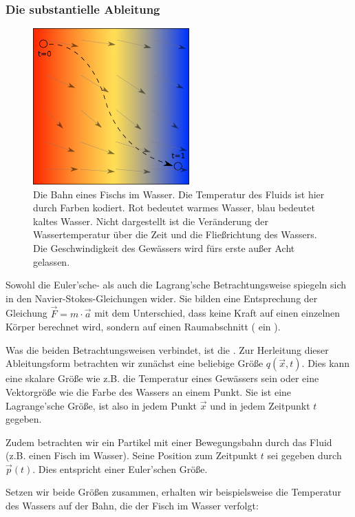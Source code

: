 \subsubsection{Die substantielle Ableitung}

\begin{figure}[ht]
\includegraphics[width=6cm]{images/swimmer_in_water}
\caption{Die Bahn eines Fischs im Wasser. Die Temperatur des Fluids ist hier durch Farben kodiert. Rot bedeutet warmes Wasser, blau bedeutet kaltes Wasser. Nicht dargestellt ist die Veränderung der Wassertemperatur über die Zeit und die Fließrichtung des Wassers. Die Geschwindigkeit des Gewässers wird fürs erste außer Acht gelassen.}
\end{figure}

Sowohl die Euler'sche- als auch die Lagrang'sche Betrachtungsweise spiegeln sich
in den Navier-Stokes-Gleichungen wider. Sie bilden eine Entsprechung der
Gleichung $\vec{F} = m \cdot \vec{a}$ mit dem Unterschied, dass keine Kraft auf
einen einzelnen Körper berechnet wird, sondern auf einen Raumabschnitt (
ein ).

Was die beiden Betrachtungsweisen verbindet, ist die
. Zur Herleitung dieser Ableitungsform
betrachten wir zunächst eine beliebige Größe $q(\vec{x},t)$. Dies kann eine
skalare Größe wie z.B. die Temperatur eines Gewässers sein oder eine Vektorgröße
wie die Farbe des Wassers an einem Punkt. Sie ist eine Lagrange'sche Größe, ist
also in jedem Punkt $\vec{x}$ und in jedem Zeitpunkt $t$ gegeben.

Zudem betrachten wir ein Partikel mit einer Bewegungsbahn durch das Fluid (z.B.
einen Fisch im Wasser). Seine Position zum Zeitpunkt $t$ sei gegeben durch
$\vec{p}(t)$. Dies entspricht einer Euler'schen Größe.

Setzen wir beide Größen zusammen, erhalten wir beispielsweise die Temperatur des
Wassers auf der Bahn, die der Fisch im Wasser verfolgt:

